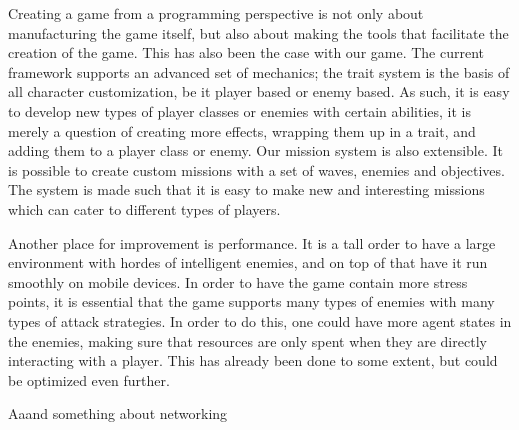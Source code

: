 Creating a game from a programming perspective is not only about manufacturing the game itself, but also about making the tools that facilitate the creation of the game.
This has also been the case with our game.
The current framework supports an advanced set of mechanics; the trait system is the basis of all character customization, be it player based or enemy based.
As such, it is easy to develop new types of player classes or enemies with certain abilities, it is merely a question of creating more effects, wrapping them up in a trait, and adding them to a player class or enemy.
Our mission system is also extensible.
It is possible to create custom missions with a set of waves, enemies and objectives.
The system is made such that it is easy to make new and interesting missions which can cater to different types of players. 

Another place for improvement is performance.
It is a tall order to have a large environment with hordes of intelligent enemies, and on top of that have it run smoothly on mobile devices.
In order to have the game contain more stress points, it is essential that the game supports many types of enemies with many types of attack strategies.
In order to do this, one could have more agent states in the enemies, making sure that resources are only spent when they are directly interacting with a player.
This has already been done to some extent, but could be optimized even further.


Aaand something about networking